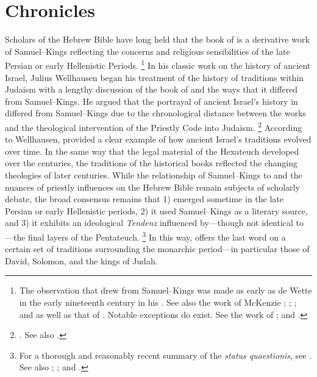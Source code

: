 
\chapter{Chronicles}
\label{chap:chronicles}

Scholars of the Hebrew Bible have long held that the book of \chronicles is a derivative work of Samuel--Kings reflecting the concerns and religious sensibilities of the late Persian or early Hellenistic Periods.%
    \footnote{The observation that \chronicles drew from Samuel--Kings was made as early as de Wette in the early nineteenth century in his \cite*{dewette1806}. See also the work of McKenzie
        \cite*{mckenzie1985};
        \cite{mckenzie_graham-mckenzie1999};
        \cite[66--71]{knoppers2003}; and
        \cite[30--42]{klein2006} as well as that of
        \cite[74--74]{carr2011}. Notable exceptions do exist. See the work of
        \cite{auld1994};
        \cite{auld_graham-mckenzie1999} and
        \cite{person2010}.}
In his classic work on the history of ancient Israel, Julius Wellhausen began his treatment of the history of traditions within Judaism with a lengthy discussion of the book of \chronicles and the ways that it differed from Samuel--Kings. He argued that the portrayal of ancient Israel's history in \chronicles differed from Samuel--Kings due to the chronological distance between the works and the theological intervention of the Priestly Code into \secondtemple Judaism.%
    \footnote{%
        \cite[171--172]{wellhausen1957}. See also
        \cite{wright_ulrich-wright1992}.}
According to Wellhausen, \chronicles provided a clear example of how ancient Israel's traditions evolved over time. In the same way that the legal material of the Hexateuch developed over the centuries, the traditions of the historical books reflected the changing theologies of later centuries. While the relationship of Samuel--Kings to \chronicles and the nuances of priestly influences on the Hebrew Bible remain subjects of scholarly debate, the broad consensus remains that 1) \chronicles emerged sometime in the late Persian or early Hellenistic periods, 2) it used Samuel--Kings as a literary source, and 3) it exhibits an ideological \emph{Tendenz} influenced by---though not identical to---the final layers of the Pentateuch.%
    \footnote{For a thorough and reasonably recent summary of the \emph{status quaestionis}, see
        \cite[72--89]{knoppers2003}. See also
        \cite{japhet1993};
        \cite{japhet2009};
        \cite{braun1986} and
        \cite{coggins1976}.}
In this way, \chronicles offers the last word on a certain set of traditions surrounding the monarchic period---in particular those of David, Solomon, and the kings of Judah.

